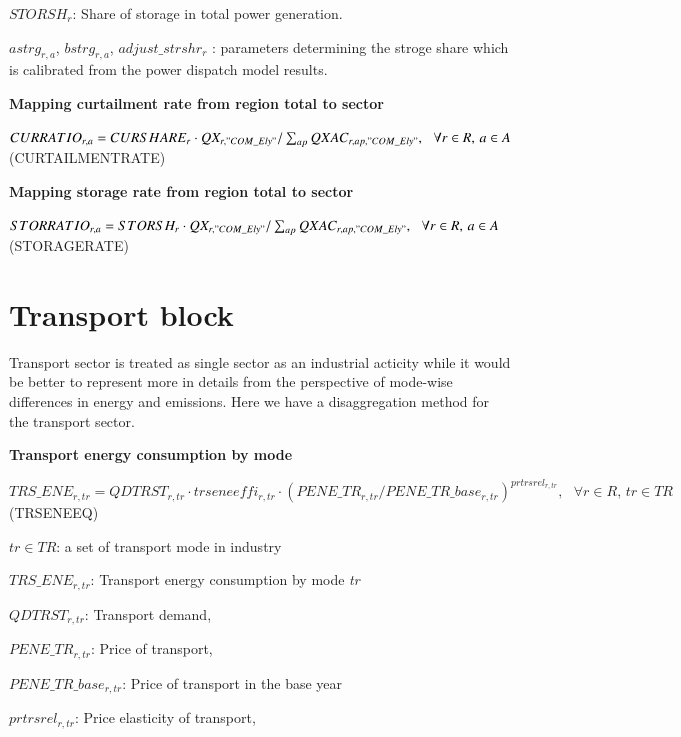 \documentclass[10pt,a4paper,titlepage,dvipdfmx]{book}
\begin{document}
$STORSH_{r}$: Share of storage in total power generation.

$astrg_{r,a}$, $bstrg_{r,a}$, $adjust\_strshr_{r}$ : parameters determining the stroge share which is calibrated from the power dispatch model results.

\begin{flushleft}\textbf{Mapping curtailment rate from region total to sector}\end{flushleft}


\begin{center}$CURRATIO_{r,a}=CURSHARE_{r}\cdot QX_{r,"COM\_ Ely"}/\sum _{ap}QXAC_{r,ap,"COM\_ Ely"},\,\,\,\,\forall r\in R,\,a\in A$ (CURTAILMENTRATE)
\end{center}

\begin{flushleft}\textbf{Mapping storage rate from region total to sector}\end{flushleft}


\begin{center}$STORRATIO_{r,a}=STORSH_{r}\cdot QX_{r,"COM\_ Ely"}/\sum _{ap}QXAC_{r,ap,"COM\_ Ely"},\,\,\,\,\forall r\in R,\,a\in A$ (STORAGERATE)
\end{center}

\section{\label{sec:TransportBlo}Transport block\label{mark-4.12.}}

Transport sector is treated as single sector as an industrial acticity while it would be better to represent more in details from the perspective of mode-wise differences in energy and emissions. Here we have a disaggregation method for the transport sector.

\begin{flushleft}\textbf{Transport energy consumption by mode}\end{flushleft}


\begin{center}$TRS\_ ENE_{r,tr}=QDTRST_{r,tr}\cdot trseneeffi_{r,tr}\cdot \left(PENE\_ TR_{r,tr}/PENE\_ TR\_ base_{r,tr}\right)^{prtrsrel_{r,tr}},\,\,\,\,\forall r\in R,\,tr\in TR$ (TRSENEEQ)
\end{center}

\begin{flushleft}
$tr\in TR$: a set of transport mode in industry

$TRS\_ENE_{r,tr}$: Transport energy consumption by mode \textit{tr}

$QDTRST_{r,tr}$: Transport demand,

$PENE\_TR_{r,tr}$: Price of transport,

$PENE\_TR\_base_{r,tr}$: Price of transport in the base year

$prtrsrel_{r,tr}$: Price elasticity of transport,
\end{flushleft}
\end{document}
